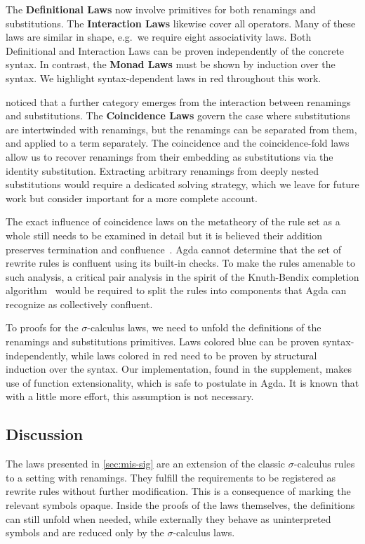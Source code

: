 \documentclass[screen,nonacm]{acmart}
\begin{document}
The \textbf{Definitional Laws} now involve primitives for both renamings and
substitutions. The \textbf{Interaction Laws} likewise cover all operators. Many
of these laws are similar in shape, e.g.\ we require eight associativity laws.
Both Definitional and Interaction Laws can be proven independently of the
concrete syntax. In contrast, the \textbf{Monad Laws} must be shown by
induction over the syntax. We highlight syntax-dependent laws in red throughout
this work.

\citet{10.1145/3293880.3294101} noticed that a further category emerges from the interaction between
renamings and substitutions. The \textbf{Coincidence Laws} govern the case where
substitutions are intertwinded with renamings, but the renamings can be
separated from them, and applied to a term separately.
The coincidence and the coincidence-fold laws
allow us to recover renamings from their embedding as substitutions via the
identity substitution. Extracting arbitrary renamings from deeply nested substitutions would require a
dedicated solving strategy, which we leave for future work but consider
important for a more complete account.

The exact influence of coincidence laws on the metatheory of the rule set as a
whole still needs to be examined in detail but it is believed their addition
preserves termination and confluence~\cite{10.1145/3293880.3294101}. Agda
cannot determine that the set of rewrite rules is confluent using its built-in
checks. To make the rules amenable to such analysis, a critical pair analysis
in the spirit of the Knuth-Bendix completion algorithm~\cite{knuth1970simple}
would be required to split the rules into components that Agda can recognize as
collectively confluent.

To proofs for the $σ$-calculus laws, we need to unfold the definitions of the
renamings and substitutions primitives. Laws colored blue can be proven
syntax-independently, while laws colored in red need to be proven by structural
induction over the syntax. Our implementation, found in the supplement, makes
use of function extensionality, which is safe to postulate in Agda. It is known
that with a little more effort, this assumption is not necessary.

\subsection{Discussion}\label{sec:mis-dis}
The laws presented in \cref{sec:mis-sig} are an extension of the classic
$σ$-calculus rules to a setting with renamings. They fulfill the requirements
to be registered as rewrite rules without further modification. This is a
consequence of marking the relevant symbols opaque. Inside the proofs of the
laws themselves, the definitions can still unfold when needed, while externally
they behave as uninterpreted symbols and are reduced only by the $σ$-calculus
laws.
\end{document}
